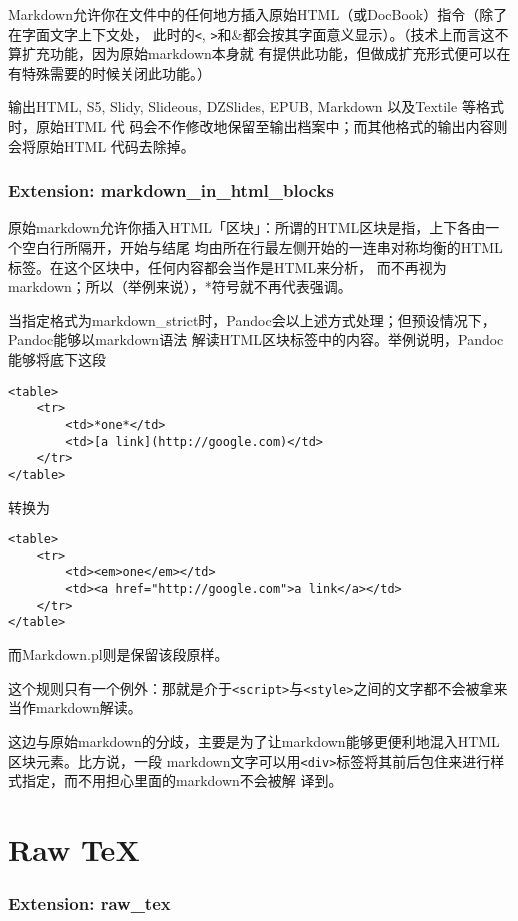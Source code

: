 \documentclass[fancyhdr,bookmark]{ctexbook}
\begin{document}
Markdown允许你在文件中的任何地方插入原始HTML（或DocBook）指令（除了在字面文字上下文处，
此时的\lstinline!<!,
\lstinline!>!和\&都会按其字面意义显示）。（技术上而言这不算扩充功能，因为原始markdown本身就
有提供此功能，但做成扩充形式便可以在有特殊需要的时候关闭此功能。）

输出HTML, S5, Slidy, Slideous, DZSlides, EPUB, Markdown 以及Textile
等格式时，原始HTML 代
码会不作修改地保留至输出档案中；而其他格式的输出内容则会将原始HTML
代码去除掉。

\subsubsection{Extension:
markdown\_in\_html\_blocks}\label{extension-markdownux5finux5fhtmlux5fblocks}

原始markdown允许你插入HTML「区块」：所谓的HTML区块是指，上下各由一个空白行所隔开，开始与结尾
均由所在行最左侧开始的一连串对称均衡的HTML标签。在这个区块中，任何内容都会当作是HTML来分析，
而不再视为markdown；所以（举例来说），*符号就不再代表强调。

当指定格式为markdown\_strict时，Pandoc会以上述方式处理；但预设情况下，Pandoc能够以markdown语法
解读HTML区块标签中的内容。举例说明，Pandoc能够将底下这段

\begin{lstlisting}
<table>
    <tr>
        <td>*one*</td>
        <td>[a link](http://google.com)</td>
    </tr>
</table>
\end{lstlisting}

转换为

\begin{lstlisting}
<table>
    <tr>
        <td><em>one</em></td>
        <td><a href="http://google.com">a link</a></td>
    </tr>
</table>
\end{lstlisting}

而Markdown.pl则是保留该段原样。

这个规则只有一个例外：那就是介于\lstinline!<script>!与\lstinline!<style>!之间的文字都不会被拿来当作markdown解读。

这边与原始markdown的分歧，主要是为了让markdown能够更便利地混入HTML区块元素。比方说，一段
markdown文字可以用\lstinline!<div>!标签将其前后包住来进行样式指定，而不用担心里面的markdown不会被解
译到。

\section{Raw TeX}\label{raw-tex}

\subsubsection{Extension: raw\_tex}\label{extension-rawux5ftex}
\end{document}
